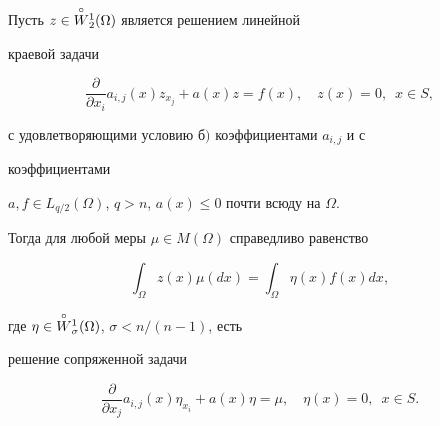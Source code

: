 \begin{lems} 


Пусть $z\in\overset{\circ}{W}{}^1_2(\Omega)$ является решением линейной 


краевой задачи 


$$ 


\frac{\partial}{\partial x_i}a_{i,j}(x)z_{x_j} 


+a(x)z=f(x),\quad z(x)=0,\ \; x\in S, 


$$ 


с удовлетворяющими условию $б)$ коэффициентами $a_{i,j}$ и с 


коэффициентами 


$a,f\in L_{q/2}(\Omega)$, $q>n$, $a(x)\le0$ почти всюду на $\Omega$.


Тогда для любой меры $\mu\in 


M(\Omega)$ справедливо равенство 


\begin{equation} 


\int_\Omega z(x)\mu(dx)=\int_\Omega \eta(x)f(x)dx, 


\end{equation} 


где $\eta\in\overset{\circ}{W}{}^1_\sigma(\Omega)$, $\sigma<n/(n-1)$, есть 


решение сопряженной задачи 


\begin{equation} 


\frac{\partial}{\partial x_j}a_{i,j}(x)\eta_{x_i} 


+a(x)\eta=\mu,\quad \eta(x)=0,\ \; x\in S. 


\end{equation} 


\end{lems} 


 


